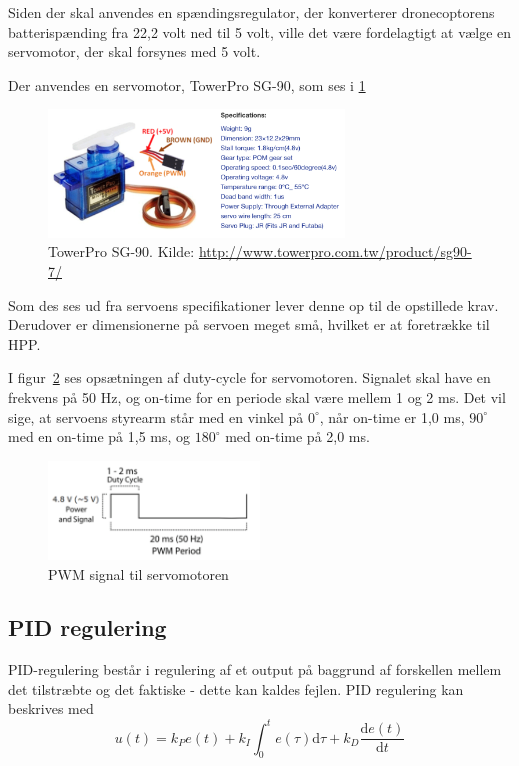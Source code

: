 \noindent Siden der skal anvendes en spændingsregulator, der konverterer dronecoptorens batterispænding fra 22,2 volt ned til 5 volt, ville det være fordelagtigt at vælge en servomotor, der skal forsynes med 5 volt.

Der anvendes en servomotor, TowerPro SG-90, som ses i \ref{fig:anath2}

\begin{figure}[h]
  \centering
  \includegraphics[width=0.7\textwidth]{./figurer/anath2.png}
  \caption{TowerPro SG-90. Kilde: \url{http://www.towerpro.com.tw/product/sg90-7/}}
  \label{fig:anath2}
\end{figure}

Som des ses ud fra servoens specifikationer lever denne op til de opstillede krav. Derudover er dimensionerne på servoen meget små, hvilket er at foretrække til HPP.

I figur~\ref{fig:anath3} ses opsætningen af duty-cycle for servomotoren. Signalet skal have en frekvens på 50 Hz, og on-time for en periode skal være mellem 1 og 2 ms. Det vil sige, at servoens styrearm står med en vinkel på $0^\circ$, når on-time er 1,0 ms, $90^\circ$ med en on-time på 1,5 ms, og $180^\circ$ med on-time på 2,0 ms. 

\begin{figure}[h]
  \centering
  \includegraphics[width=0.5\textwidth]{./figurer/anath3.png}
  \caption{PWM signal til servomotoren}
  \label{fig:anath3}
\end{figure}

\subsection{PID regulering}
\label{sec:overordnet-mal}

PID-regulering består i regulering af et output på baggrund af forskellen mellem det tilstræbte og det faktiske - dette kan kaldes fejlen. PID regulering kan beskrives med
\begin{equation}
  \label{eq:1}
  u(t)=k_Pe(t)+k_I \int_0^t e(\tau)\mathrm{d}\tau + k_D\frac{\mathrm{d}e(t)}{\mathrm{d}t}
\end{equation}

